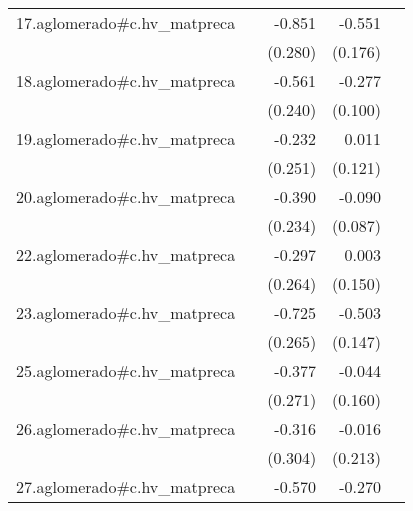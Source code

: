 {\begin{longtable}{l*{4}{D{.}{.}{-1}}}
\addlinespace
17.aglomerado#c.hv\_matpreca&                     &      -0.851\sym{**} &      -0.551\sym{**} &                     \\
            &                     &     (0.280)         &     (0.176)         &                     \\
\addlinespace
18.aglomerado#c.hv\_matpreca&                     &      -0.561\sym{*}  &      -0.277\sym{**} &                     \\
            &                     &     (0.240)         &     (0.100)         &                     \\
\addlinespace
19.aglomerado#c.hv\_matpreca&                     &      -0.232         &       0.011         &                     \\
            &                     &     (0.251)         &     (0.121)         &                     \\
\addlinespace
20.aglomerado#c.hv\_matpreca&                     &      -0.390         &      -0.090         &                     \\
            &                     &     (0.234)         &     (0.087)         &                     \\
\addlinespace
22.aglomerado#c.hv\_matpreca&                     &      -0.297         &       0.003         &                     \\
            &                     &     (0.264)         &     (0.150)         &                     \\
\addlinespace
23.aglomerado#c.hv\_matpreca&                     &      -0.725\sym{**} &      -0.503\sym{***}&                     \\
            &                     &     (0.265)         &     (0.147)         &                     \\
\addlinespace
25.aglomerado#c.hv\_matpreca&                     &      -0.377         &      -0.044         &                     \\
            &                     &     (0.271)         &     (0.160)         &                     \\
\addlinespace
26.aglomerado#c.hv\_matpreca&                     &      -0.316         &      -0.016         &                     \\
            &                     &     (0.304)         &     (0.213)         &                     \\
\addlinespace
27.aglomerado#c.hv\_matpreca&                     &      -0.570\sym{*}  &      -0.270\sym{***}&                     \\

\end{longtable}}
